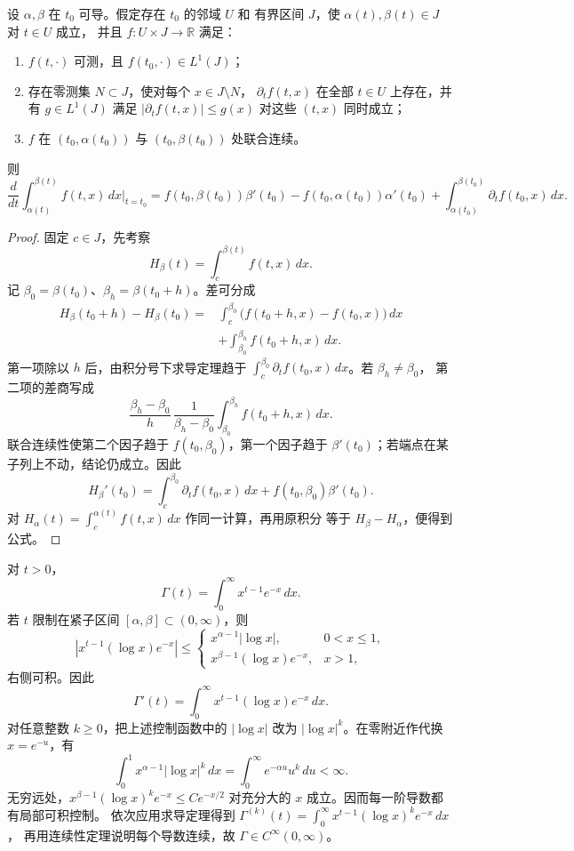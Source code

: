 \begin{corollary}[Leibniz 公式]
\label{cor:leibniz-variable-limits}
设 \(\alpha,\beta\) 在 \(t_0\) 可导。假定存在 \(t_0\) 的邻域 \(U\) 和
有界区间 \(J\)，使 \(\alpha(t),\beta(t)\in J\) 对 \(t\in U\) 成立，
并且 \(f:U\times J\to\mathbb R\) 满足：
\begin{enumerate}[label=\textup{(\roman*)}]
 \item \(f(t,\cdot)\) 可测，且 \(f(t_0,\cdot)\in L^1(J)\)；
 \item 存在零测集 \(N\subset J\)，使对每个 \(x\in J\setminus N\)，
 \(\partial_tf(t,x)\) 在全部 \(t\in U\) 上存在，并有 \(g\in L^1(J)\)
 满足 \(|\partial_tf(t,x)|\le g(x)\) 对这些 \((t,x)\) 同时成立；
 \item \(f\) 在
 \((t_0,\alpha(t_0))\) 与 \((t_0,\beta(t_0))\) 处联合连续。
\end{enumerate}
则
\[
 \frac d{dt}\int_{\alpha(t)}^{\beta(t)}f(t,x)\,dx\bigg|_{t=t_0}
 =
 f(t_0,\beta(t_0))\beta'(t_0)
 -f(t_0,\alpha(t_0))\alpha'(t_0)
 +\int_{\alpha(t_0)}^{\beta(t_0)}
   \partial_tf(t_0,x)\,dx.
\]
\end{corollary}

\begin{proof}
固定 \(c\in J\)，先考察
\[
 H_\beta(t)=\int_c^{\beta(t)}f(t,x)\,dx.
\]
记 \(\beta_0=\beta(t_0)\)、\(\beta_h=\beta(t_0+h)\)。差可分成
\[
 \begin{split}
 H_\beta(t_0+h)-H_\beta(t_0)
 ={}&\int_c^{\beta_0}
       \bigl(f(t_0+h,x)-f(t_0,x)\bigr)\,dx\\
 &+\int_{\beta_0}^{\beta_h}f(t_0+h,x)\,dx.
 \end{split}
\]
第一项除以 \(h\) 后，由积分号下求导定理趋于
\(\int_c^{\beta_0}\partial_tf(t_0,x)\,dx\)。若 \(\beta_h\ne\beta_0\)，
第二项的差商写成
\[
 \frac{\beta_h-\beta_0}{h}\,
 \frac1{\beta_h-\beta_0}
 \int_{\beta_0}^{\beta_h}f(t_0+h,x)\,dx.
\]
联合连续性使第二个因子趋于 \(f(t_0,\beta_0)\)，第一个因子趋于
\(\beta'(t_0)\)；若端点在某子列上不动，结论仍成立。因此
\[
 H_\beta'(t_0)
 =\int_c^{\beta_0}\partial_tf(t_0,x)\,dx
  +f(t_0,\beta_0)\beta'(t_0).
\]
对 \(H_\alpha(t)=\int_c^{\alpha(t)}f(t,x)\,dx\) 作同一计算，再用原积分
等于 \(H_\beta-H_\alpha\)，便得到公式。
\end{proof}

\begin{example}
对 \(t>0\)，
\[
 \Gamma(t)=\int_0^\infty x^{t-1}e^{-x}\,dx.
\]
若 \(t\) 限制在紧子区间 \([\alpha,\beta]\subset(0,\infty)\)，则
\[
 |x^{t-1}(\log x)e^{-x}|
\le
\begin{cases}
 x^{\alpha-1}|\log x|,&0<x\le1,\\
 x^{\beta-1}(\log x)e^{-x},&x>1,
\end{cases}
\]
右侧可积。因此
\[
 \Gamma'(t)=\int_0^\infty x^{t-1}(\log x)e^{-x}\,dx.
\]
对任意整数 \(k\ge0\)，把上述控制函数中的 \(|\log x|\) 改为
\(|\log x|^k\)。在零附近作代换 \(x=e^{-u}\)，有
\[
 \int_0^1x^{\alpha-1}|\log x|^k\,dx
 =\int_0^\infty e^{-\alpha u}u^k\,du<\infty.
\]
无穷远处，\(x^{\beta-1}(\log x)^ke^{-x}\le C e^{-x/2}\)
对充分大的 \(x\) 成立。因而每一阶导数都有局部可积控制。
依次应用求导定理得到
\(\Gamma^{(k)}(t)=\int_0^\infty x^{t-1}(\log x)^ke^{-x}\,dx\)，
再用连续性定理说明每个导数连续，故 \(\Gamma\in C^\infty(0,\infty)\)。
\end{example}

